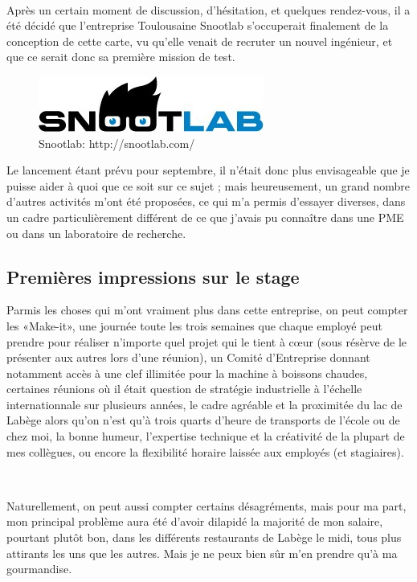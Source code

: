 \documentclass{article}
\begin{document}
~

Après un certain moment de discussion, d’hésitation, et quelques rendez-vous, il a été décidé que l’entreprise Toulousaine Snootlab s’occuperait finalement de la conception de cette carte, vu qu’elle venait de recruter un nouvel ingénieur, et que ce serait donc sa première mission de test.

\begin{figure}[h!]
    \centering\includegraphics[width=\linewidth/2]{img/snoot.jpg}
    \caption{Snootlab: http://snootlab.com/}
\end{figure}

Le lancement étant prévu pour septembre, il n’était donc plus envisageable que je puisse aider à quoi que ce soit sur ce sujet ; mais heureusement, un grand nombre d’autres activités m’ont été proposées, ce qui m’a permis d’essayer diverses, dans un cadre particulièrement différent de ce que j’avais pu connaître dans une PME ou dans un laboratoire de recherche.

\subsection{Premières impressions sur le stage}

Parmis les choses qui m’ont vraiment plus dans cette entreprise, on peut compter les «Make-it», une journée toute les trois semaines que chaque employé peut prendre pour réaliser n’importe quel projet qui le tient à cœur (sous résèrve de le présenter aux autres lors d’une réunion), un Comité d’Entreprise donnant notamment accès à une clef illimitée pour la machine à boissons chaudes, certaines réunions où il était question de stratégie industrielle à l’échelle internationnale sur plusieurs années, le cadre agréable et la proximitée du lac de Labège alors qu’on n’est qu’à trois quarts d’heure de transports de l’école ou de chez moi, la bonne humeur, l’expertise technique et la créativité de la plupart de mes collègues, ou encore la flexibilité horaire laissée aux employés (et stagiaires).

~

Naturellement, on peut aussi compter certains désagréments, mais pour ma part, mon principal problème aura été d’avoir dilapidé la majorité de mon salaire, pourtant plutôt bon, dans les différents restaurants de Labège le midi, tous plus attirants les uns que les autres. Mais je ne peux bien sûr m’en prendre qu’à ma gourmandise.
\end{document}
